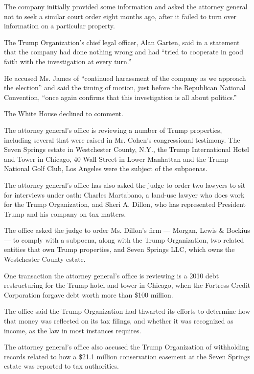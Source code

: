 The company initially provided some information and asked the attorney
general not to seek a similar court order eight months ago, after it
failed to turn over information on a particular property.

The Trump Organization's chief legal officer, Alan Garten, said in a
statement that the company had done nothing wrong and had ``tried to
cooperate in good faith with the investigation at every turn.''

He accused Ms. James of ``continued harassment of the company as we
approach the election'' and said the timing of motion, just before the
Republican National Convention, ``once again confirms that this
investigation is all about politics.''

The White House declined to comment.

The attorney general's office is reviewing a number of Trump properties,
including several that were raised in Mr. Cohen's congressional
testimony. The Seven Springs estate in Westchester County, N.Y., the
Trump International Hotel and Tower in Chicago, 40 Wall Street in Lower
Manhattan and the Trump National Golf Club, Los Angeles were the subject
of the subpoenas.

The attorney general's office has also asked the judge to order two
lawyers to sit for interviews under oath: Charles Martabano, a land-use
lawyer who does work for the Trump Organization, and Sheri A. Dillon,
who has represented President Trump and his company on tax matters.

The office asked the judge to order Ms. Dillon's firm --- Morgan, Lewis
\& Bockius --- to comply with a subpoena, along with the Trump
Organization, two related entities that own Trump properties, and Seven
Springs LLC, which owns the Westchester County estate.

One transaction the attorney general's office is reviewing is a 2010
debt restructuring for the Trump hotel and tower in Chicago, when the
Fortress Credit Corporation forgave debt worth more than \$100 million.

The office said the Trump Organization had thwarted its efforts to
determine how that money was reflected on its tax filings, and whether
it was recognized as income, as the law in most instances requires.

The attorney general's office also accused the Trump Organization of
withholding records related to how a \$21.1 million conservation
easement at the Seven Springs estate was reported to tax authorities.

